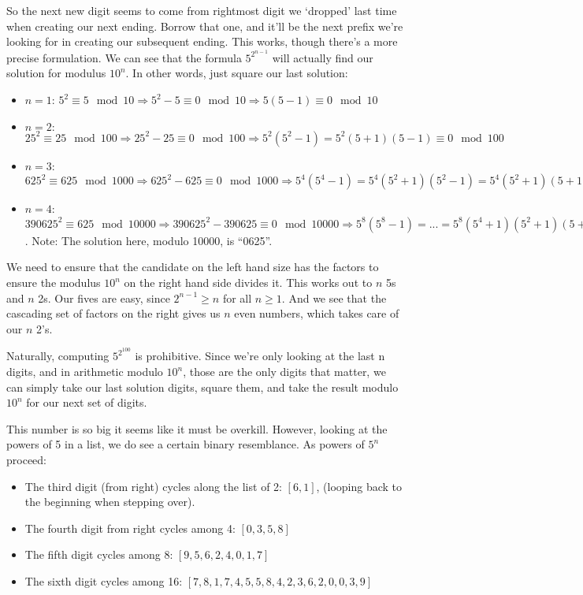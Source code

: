 \documentclass[11pt, oneside]{article} 	%
\begin{document}
So the next new digit seems to come from rightmost digit we `dropped' last time when creating our next ending.  Borrow that one, and it'll be the next prefix we're looking for in creating our subsequent ending.  This works, though there's a more precise formulation.  We can see that the formula $5^{2^{n-1}}$ will actually find our solution for modulus $10^n$.  In other words, just square our last solution: 

\begin{itemize}
\item $n=1$: $5^2 \equiv 5 \mod 10 \Rightarrow 5^2 - 5 \equiv 0 \mod 10 \Rightarrow 5(5-1) \equiv 0 \mod 10$
\item $n=2:$ $25^2 \equiv 25 \mod 100 \Rightarrow 25^2 - 25 \equiv 0 \mod 100 \Rightarrow 5^2(5^2-1) = 5^2(5+1)(5-1) \equiv 0 \mod 100$
\item $n=3$: $625^2 \equiv 625 \mod 1000 \Rightarrow 625^2 - 625 \equiv 0 \mod 1000 \Rightarrow 5^4(5^4-1) = 5^4(5^2+1)(5^2-1) = 5^4(5^2+1)(5+1)(5-1) \equiv 0 \mod 1000$
\item $n=4$:   $390625^2 \equiv 625 \mod 10000 \Rightarrow 390625^2 - 390625 \equiv 0 \mod 10000 \Rightarrow 5^8(5^8-1) = ... =5^8(5^4+1)(5^2+1)(5+1)(5-1) \equiv 0 \mod 10000$.  Note: The solution here, modulo 10000, is ``0625''.
\end{itemize}

We need to ensure that the candidate on the left hand size has the factors to ensure the modulus $10^n$ on the right hand side divides it.  This works out to $n$ 5s and $n$ 2s.  Our fives are easy, since $2^{n-1} \geq n$ for all $n \geq 1$.  And we see that the cascading set of factors on the right gives us $n$ even numbers, which takes care of our $n$ 2's.

Naturally, computing $5^{2^{100}}$ is prohibitive.  Since we're only looking at the last n digits, and in arithmetic modulo $10^n$, those are the only digits that matter, we can simply take our last solution digits, square them, and take the result modulo $10^n$ for our next set of digits.

This number is so big it seems like it must be overkill.  However, looking at the powers of 5 in a list, we do see a certain binary resemblance.  As powers of $5^n$ proceed:
\begin{itemize}
\item The third digit (from right) cycles along the list of 2: $[6, 1]$, (looping back to the beginning when stepping over).
\item The fourth digit from right cycles among 4: $[0, 3, 5, 8]$
\item The fifth digit cycles among 8: $[9,5,6,2,4,0,1,7]$
\item The sixth digit cycles among 16: $[7,8,1,7,4,5,5,8,4,2,3,6,2,0,0,3,9]$
\end{itemize}
\end{document}
